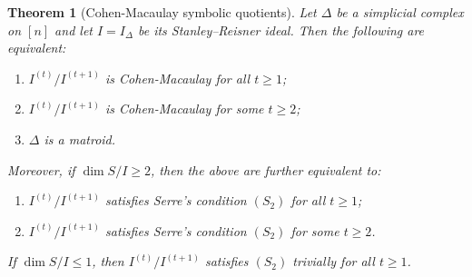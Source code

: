 \documentclass[12pt]{amsart}
\numberwithin{equation}{section}
\newtheorem{theorem}{Theorem}[section]
\theoremstyle{definition}
\theoremstyle{definition}
\begin{document}
\begin{theorem}[Cohen-Macaulay symbolic quotients] \label{Main1}
	Let $\Delta$ be a simplicial complex on $[n]$ and let $I=I_{\Delta}$ be its Stanley--Reisner ideal.
	Then the following are equivalent:
	\begin{enumerate}
		\item[(1)] $I^{(t)}/I^{(t+1)}$ is Cohen-Macaulay for all $t\ge1$;
		\item[(2)] $I^{(t)}/I^{(t+1)}$ is Cohen-Macaulay for some $t\ge2$;
		\item[(3)] $\Delta$ is a matroid.
	\end{enumerate}
	Moreover, if $\dim S/I \ge2$, then the above are further equivalent to:
	\begin{enumerate}
		\item[(4)] $I^{(t)}/I^{(t+1)}$ satisfies Serre's condition $(S_2)$ for all $t\ge1$;
		\item[(5)] $I^{(t)}/I^{(t+1)}$ satisfies Serre's condition $(S_2)$ for some $t\ge2$.
	\end{enumerate}
	If $\dim S/I \le1$, then $I^{(t)}/I^{(t+1)}$ satisfies $(S_2)$ trivially for all $t\ge1$.
\end{theorem}
\end{document}
